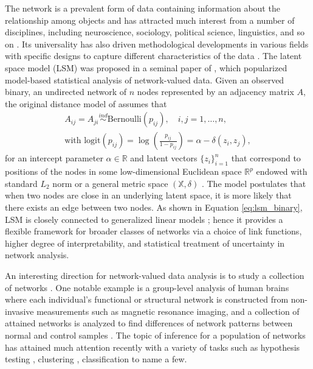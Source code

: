 \documentclass[12pt]{article}
\newcommand{\bbR}{\mathbb{R}}
\newcommand{\bbX}{\mathbb{X}}
\begin{document}
The network is a prevalent form of data containing information about the relationship among objects and has attracted much interest from a number of disciplines, including neuroscience, sociology, political science, linguistics, and so on \citep{newman_networks_2010, barabasi_network_2016}. Its universality has also driven methodological developments in various fields with specific designs to capture different characteristics of the data \citep{goldenberg_survey_2009}. The latent space model (LSM) was proposed in a seminal paper of \cite{hoff_latent_2002-1}, which popularized model-based statistical analysis of network-valued data. Given an observed binary, an undirected network of $n$ nodes represented by an adjacency matrix $A$, the original distance model of \cite{hoff_latent_2002-1} assumes that 
\begin{equation}\label{eq:lsm_binary}
\begin{gathered}
A_{ij} = A_{ji} \overset{ind}{\sim} \text{Bernoulli}(p_{ij}),\quad  i,j=1,\ldots,n, \\
\textrm{with }  \text{logit} (p_{ij}) = \log \left( \frac{p_{ij}}{1-p_{ij}}\right) = \alpha  - \delta (z_i, z_j),
\end{gathered}
\end{equation}
for an intercept parameter $\alpha \in \bbR$ and latent vectors $\lbrace z_i \rbrace_{i=1}^n$ that correspond to positions of the nodes in some low-dimensional Euclidean space $\bbR^p$ endowed with standard $L_2$ norm or a general metric space $(\bbX, \delta)$ \citep{smith_geometry_2019}. 
The model postulates that when two nodes are close in an underlying latent space, it is more likely that there exists an edge between two nodes. As shown in Equation \eqref{eq:lsm_binary}, LSM is closely connected to generalized linear models \citep{nelder_generalized_1972}; hence it provides a flexible framework for broader classes of networks via a choice of link functions, higher degree of interpretability, and statistical treatment of uncertainty in network analysis.

An interesting direction for network-valued data analysis is to study a collection of networks  \citep{tantardini_comparing_2019}. One notable example is a group-level analysis of human brains where each individual's functional or structural network is constructed from non-invasive measurements such as magnetic resonance imaging, and a collection of attained networks is analyzed to find differences of network patterns between normal and control samples \citep{park_structural_2013-1}. The topic of inference for a population of networks has attained much attention recently with a variety of tasks such as hypothesis testing \citep{10.1214/16-AOAS1015,9233364}, clustering \citep{10.5555/3295222.3295450}, classification \citep{10.1214/19-AOAS1252} to name a few.
\end{document}
